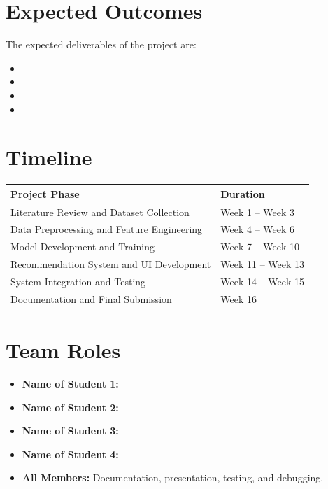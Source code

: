 \documentclass[12pt,a4paper]{article}
\begin{document}
\section{Expected Outcomes}
The expected deliverables of the project are:
\begin{itemize}
    \item 
    \item 
    \item 
    \item 
\end{itemize}

\section{Timeline}
\begin{center}
\begin{tabular}{|p{8cm}|p{5cm}|}
\hline
\textbf{Project Phase} & \textbf{Duration} \\
\hline
Literature Review and Dataset Collection & Week 1 -- Week 3 \\
\hline
Data Preprocessing and Feature Engineering & Week 4 -- Week 6 \\
\hline
Model Development and Training & Week 7 -- Week 10 \\
\hline
Recommendation System and UI Development & Week 11 -- Week 13 \\
\hline
System Integration and Testing & Week 14 -- Week 15 \\
\hline
Documentation and Final Submission & Week 16 \\
\hline
\end{tabular}
\end{center}



\section{Team Roles}
\begin{itemize}
    \item \textbf{Name of Student 1:}   
    \item \textbf{Name of Student 2:}  
    \item \textbf{Name of Student 3:}  
    \item \textbf{Name of Student 4:}  
    \item \textbf{All Members:} Documentation, presentation, testing, and debugging.
\end{itemize}
\end{document}
